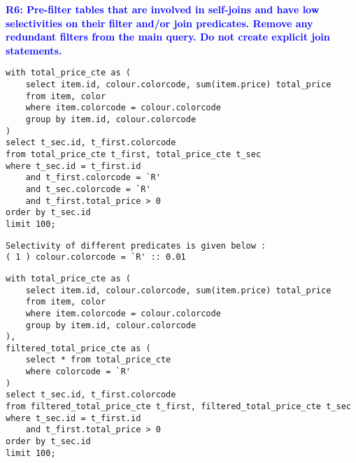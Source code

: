 \begin{flushleft}
\newpage
\noindent\textcolor{blue}{\large \textbf{R6: Pre-filter tables that are involved in self-joins and have low selectivities on their filter and/or join predicates. Remove any redundant filters from the main query. Do not create explicit join statements.}}

\vspace{0.2in}
\begin{verbatim}
with total_price_cte as (  
    select item.id, colour.colorcode, sum(item.price) total_price  
    from item, color  
    where item.colorcode = colour.colorcode  
    group by item.id, colour.colorcode  
)  
select t_sec.id, t_first.colorcode  
from total_price_cte t_first, total_price_cte t_sec  
where t_sec.id = t_first.id  
    and t_first.colorcode = `R'  
    and t_sec.colorcode = `R'  
    and t_first.total_price > 0  
order by t_sec.id  
limit 100;
\end{verbatim}

\vspace{0.1in}
\begin{verbatim}
Selectivity of different predicates is given below : 
( 1 ) colour.colorcode = `R' :: 0.01
\end{verbatim}

\vspace{0.1in}
\begin{verbatim}
with total_price_cte as (  
    select item.id, colour.colorcode, sum(item.price) total_price  
    from item, color  
    where item.colorcode = colour.colorcode  
    group by item.id, colour.colorcode  
),  
filtered_total_price_cte as (  
    select * from total_price_cte  
    where colorcode = `R'  
)  
select t_sec.id, t_first.colorcode  
from filtered_total_price_cte t_first, filtered_total_price_cte t_sec  
where t_sec.id = t_first.id  
    and t_first.total_price > 0  
order by t_sec.id  
limit 100;
 \end{verbatim}



\end{flushleft}
